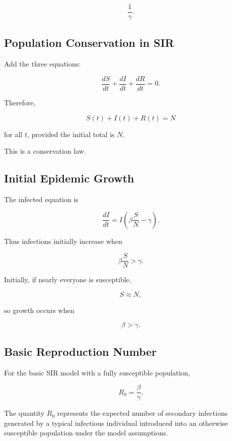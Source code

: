 \[
\boxed{
\frac{1}{\gamma}.
}
\]

\subsection{Population Conservation in SIR}
\label{subsec:sir-conservation}

Add the three equations:

\[
\frac{dS}{dt}
+
\frac{dI}{dt}
+
\frac{dR}{dt}
=
0.
\]

Therefore,

\[
\boxed{
S(t)+I(t)+R(t)=N
}
\]

for all \(t\), provided the initial total is \(N\).

This is a conservation law.

\subsection{Initial Epidemic Growth}
\label{subsec:initial-epidemic-growth}

The infected equation is

\[
\frac{dI}{dt}
=
I
\left(
\beta\frac{S}{N}
-
\gamma
\right).
\]

Thus infections initially increase when

\[
\boxed{
\beta\frac{S}{N}
>
\gamma.
}
\]

Initially, if nearly everyone is susceptible,

\[
S\approx N,
\]

so growth occurs when

\[
\boxed{
\beta>\gamma.
}
\]

\subsection{Basic Reproduction Number}
\label{subsec:basic-reproduction-number}

For the basic SIR model with a fully susceptible population,

\[
\boxed{
R_0
=
\frac{\beta}{\gamma}.
}
\]

The quantity \(R_0\) represents the expected number of secondary infections
generated by a typical infectious individual introduced into an otherwise
susceptible population under the model assumptions.

